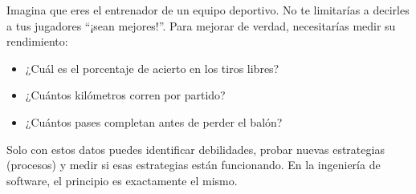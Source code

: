 Imagina que eres el entrenador de un equipo deportivo. 
No te limitarías a decirles a tus jugadores ``¡sean mejores!''. 
Para mejorar de verdad, necesitarías medir su rendimiento:
\begin{itemize}
  \item ¿Cuál es el porcentaje de acierto en los tiros libres?
  \item ¿Cuántos kilómetros corren por partido?
  \item ¿Cuántos pases completan antes de perder el balón?
\end{itemize}

Solo con estos datos puedes identificar debilidades, probar nuevas estrategias (procesos) y medir si esas estrategias están funcionando. 
En la ingeniería de software, el principio es exactamente el mismo.

